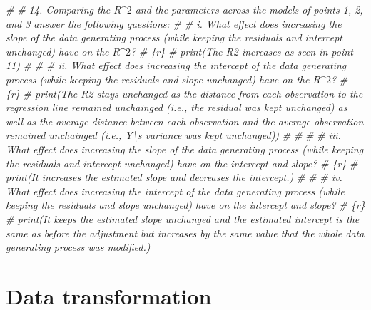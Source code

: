 \documentclass[
]{book}
\newenvironment{Shaded}{\begin{snugshade}}{\end{snugshade}}
\newcommand{\CommentTok}[1]{\textcolor[rgb]{0.56,0.35,0.01}{\textit{#1}}}
\begin{document}
\begin{Shaded}
\begin{Highlighting}[]
\CommentTok{\#}
\CommentTok{\# 14. Comparing the $R\^{}2$ and the parameters across the models of points 1, 2, and 3 answer the following questions:}
\CommentTok{\#}
\CommentTok{\#   i. What effect does increasing the slope of the data generating process (while keeping the residuals and intercept unchanged) have on the $R\^{}2$?}
\CommentTok{\# \textasciigrave{}\textasciigrave{}\textasciigrave{}\{r\}}
\CommentTok{\# print(\textquotesingle{}The R2 increases as seen in point 11\textquotesingle{})}
\CommentTok{\# \textasciigrave{}\textasciigrave{}\textasciigrave{}}
\CommentTok{\#}
\CommentTok{\#   ii. What effect does increasing the intercept of the data generating process (while keeping the residuals and slope unchanged) have on the $R\^{}2$?}
\CommentTok{\# \textasciigrave{}\textasciigrave{}\textasciigrave{}\{r\}}
\CommentTok{\# print(\textquotesingle{}The R2 stays unchanged as the distance from each observation to the regression line remained unchainged (i.e., the residual was kept unchanged) as well as the average distance between each observation and the average observation remained unchainged (i.e., Y\textbackslash{}\textquotesingle{}s variance was kept unchanged)\textquotesingle{})}
\CommentTok{\#}
\CommentTok{\# \textasciigrave{}\textasciigrave{}\textasciigrave{}}
\CommentTok{\#}
\CommentTok{\#  iii. What effect does increasing the slope of the data generating process (while keeping the residuals and intercept unchanged) have on the intercept and slope?}
\CommentTok{\# \textasciigrave{}\textasciigrave{}\textasciigrave{}\{r\}}
\CommentTok{\# print(\textquotesingle{}It increases the estimated slope and decreases the intercept.\textquotesingle{})}
\CommentTok{\# \textasciigrave{}\textasciigrave{}\textasciigrave{}}
\CommentTok{\#}
\CommentTok{\#  iv. What effect does increasing the intercept of the data generating process (while keeping the residuals and slope unchanged) have on the intercept and slope?}
\CommentTok{\# \textasciigrave{}\textasciigrave{}\textasciigrave{}\{r\}}
\CommentTok{\# print(\textquotesingle{}It keeps the estimated slope unchanged and the estimated intercept is the same as before the adjustment but increases by the same value that the whole data generating process was modified.\textquotesingle{})}
\end{Highlighting}
\end{Shaded}

\hypertarget{data-transformation}{%
\chapter{Data transformation}\label{data-transformation}}
\end{document}
